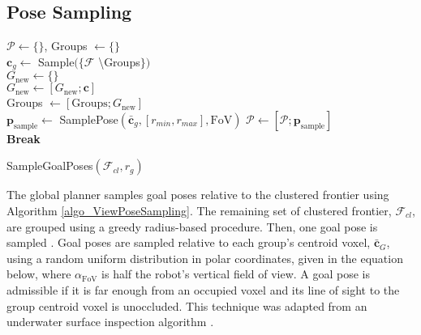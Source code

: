 \documentclass[letterpaper, 10 pt, conference]{ieeeconf}  %
\begin{document}
\subsection{Pose Sampling}

\begin{algorithm}[tbh]
\begin{algorithmic}[1]
  \STATE $\mathcal{P} \gets \{\}$, Groups $\gets \{\}$ \\
    \STATE $\bm{c}_g \gets$ Sample$(\{\mathcal{F}$ \textbackslash Groups$\})$ \\
    \STATE $G_{\text{new}} \gets \{\}$ \\
        \STATE $G_{\text{new}} \gets [G_{\text{new}}; \bm{c}]$ \\
      \ENDIF
    \ENDFOR
    \STATE Groups $\gets [\text{Groups}; G_{\text{new}}]$ \\
  \ENDWHILE
      \STATE $\bm{p}_{\text{sample}} \gets$ SamplePose$(\bar{\bm{c}}_g, [r_{min}, r_{max}], \text{FoV})$
          \STATE $\mathcal{P} \gets [\mathcal{P}; \bm{p}_{\text{sample}}]$ \\
          \STATE \textbf{Break} \\
        \ENDIF
      \ENDIF{}
    \ENDWHILE
  \ENDFOR
\end{algorithmic}
\caption{SampleGoalPoses$(\mathcal{F}_{cl}, r_g)$}
\label{algo_ViewPoseSampling}
\end{algorithm}

The global planner samples goal poses relative to the clustered frontier using Algorithm \ref{algo_ViewPoseSampling}.  The remaining set of clustered frontier, $\mathcal{F}_{cl}$, are grouped using a greedy radius-based procedure.  Then, one goal pose is sampled .  Goal poses are sampled relative to each group's centroid voxel, $\bar{\bm{c}}_G$, using a random uniform distribution in polar coordinates, given in the equation below, where $\alpha_{\text{FoV}}$ is half the robot's vertical field of view.  A goal pose is admissible if it is far enough from an occupied voxel and its line of sight to the group centroid voxel is unoccluded.  This technique was adapted from an underwater surface inspection algorithm \cite{englot2013three}. 
\end{document}
